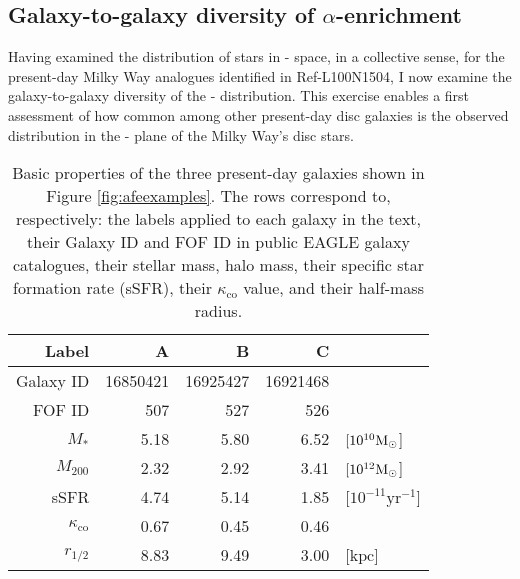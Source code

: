 \subsection{Galaxy-to-galaxy diversity of $\alpha$-enrichment}
\label{sec:afefeh_diversity}

Having examined the distribution of stars in \afe{}-\feh{} space, in a collective sense, for the present-day Milky Way analogues identified in Ref-L100N1504, I now examine the galaxy-to-galaxy diversity of the \afe{}-\feh{} distribution. This exercise enables a first assessment of how common among other present-day disc galaxies is the observed distribution in the \afe{}-\feh{} plane of the Milky Way's disc stars.

\begin{table}
\center
\caption[Properties of three example disc galaxies from the Ref-L100N1504 simulation]{\label{tab:diag} Basic properties of the three present-day galaxies shown in Figure \ref{fig:afeexamples}. The rows correspond to, respectively: the labels applied to each galaxy in the text, their Galaxy ID and FOF ID in public EAGLE galaxy catalogues, their stellar mass, halo mass, their specific star formation rate (sSFR), their  $\kappa_{\mathrm{co}}$ value, and their half-mass radius.}
\begin{tabular}[]{r|rrrl}
\hline
\hline
Label                               & A    & B    & C    &  \\
\hline
Galaxy ID							& 16850421 & 16925427 & 16921468  & \\
FOF ID                              & 507  & 527  & 526  &  \\
$M_{*}$                             & 5.18 & 5.80 & 6.52 & $[10^{10} {\rm M}_{\odot}$] \\
$M_{200}$                           & 2.32 & 2.92 & 3.41 & $[10^{12} {\rm M}_{\odot}$] \\
sSFR                                & 4.74 & 5.14 & 1.85 & [$ 10^{-11} \mathrm{yr^{-1}}$] \\
$\kappa_{\mathrm{co}}$            & 0.67 & 0.45 & 0.46 & \\
$r_{1/2}$                           & 8.83 & 9.49 & 3.00 & [$\mathrm{kpc}$] \\
\hline
\end{tabular}

\end{table}

